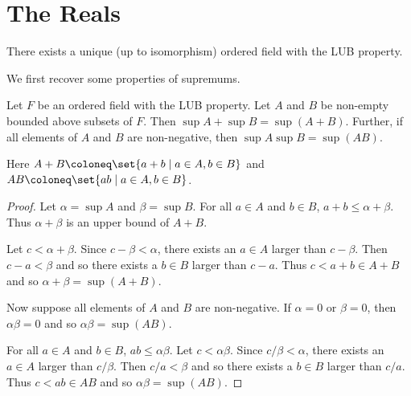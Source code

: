 \section{The Reals} \label{sec:R}
\vspace{0.5em}
\begin{theorem*} \label{thm:R:unique}
    There exists a unique (up to isomorphism) ordered field with the LUB
    property.
\end{theorem*}
We first recover some properties of supremums.
\begin{lemma} \label{thm:R:sup}
    Let $F$ be an ordered field with the LUB property.
    Let $A$ and $B$ be non-empty bounded above subsets of $F$.
    Then $\sup A + \sup B = \sup (A + B)$.
    Further, if all elements of $A$ and $B$ are non-negative, then
    $\sup A \sup B = \sup (A B)$.

    Here $A + B \coloneq \set{a + b \mid a \in A, b \in B}$ and
    $A B \coloneq \set{ab \mid a \in A, b \in B}$.
\end{lemma}
\begin{proof}
    Let $\alpha = \sup A$ and $\beta = \sup B$.
    For all $a \in A$ and $b \in B$, $a + b \le \alpha + \beta$.
    Thus $\alpha + \beta$ is an upper bound of $A + B$.

    Let $c < \alpha + \beta$.
    Since $c - \beta < \alpha$, there exists an $a \in A$ larger than
    $c - \beta$.
    Then $c - a < \beta$ and so there exists a $b \in B$ larger than
    $c - a$.
    Thus $c < a + b \in A + B$ and so $\alpha + \beta = \sup (A + B)$.

    Now suppose all elements of $A$ and $B$ are non-negative.
    If $\alpha = 0$ or $\beta = 0$, then $\alpha \beta = 0$ and so
    $\alpha \beta = \sup (A B)$.

    For all $a \in A$ and $b \in B$, $ab \le \alpha \beta$.
    Let $c < \alpha \beta$.
    Since $c/\beta < \alpha$, there exists an $a \in A$ larger than
    $c/\beta$.
    Then $c/a < \beta$ and so there exists a $b \in B$ larger than
    $c/a$.
    Thus $c < ab \in A B$ and so $\alpha \beta = \sup (A B)$.
\end{proof}

